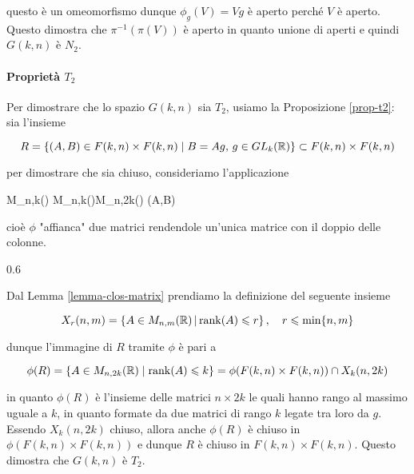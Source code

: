 questo è un omeomorfismo dunque $ \phi_{g}(V) = V g $ è aperto perché $ V $ è aperto. Questo dimostra che $ \pi^{-1}(\pi(V)) $ è aperto in quanto unione di aperti e quindi $ G(k,n) $ è $ N_{2} $.

\paragraph{Proprietà $ T_{2} $}

Per dimostrare che lo spazio $ G(k,n) $ sia $ T_{2} $, usiamo la Proposizione \ref{prop-t2}: sia l'insieme

\begin{equation}
	R = \{ (A,B) \in F(k,n) \times F(k,n) \mid B = A g, \, g \in GL_{k}(\mathbb{R}) \} \subset F(k,n) \times F(k,n)
\end{equation}

per dimostrare che sia chiuso, consideriamo l'applicazione

\map{\phi}
	{M_{n,k}(\R) \times M_{n,k}(\R)}{M_{n,2k}(\R)}
	{(A,B)}{}

cioè $ \phi $ "affianca" due matrici rendendole un'unica matrice con il doppio delle colonne.

	{0.6}{%
			}

Dal Lemma \ref{lemma-clos-matrix} prendiamo la definizione del seguente insieme

\begin{equation}
	X_{r}(n,m) = \left\{ A \in M_{n,m}(\R) \st \rank(A) \leqslant r \right\} %
	\qcomma r \leqslant \min\{n,m\}
\end{equation}

dunque l'immagine di $ R $ tramite $ \phi $ è pari a

\begin{equation}
	\phi(R) = \{ A \in M_{n,2k}(\mathbb{R}) \mid \rank(A) \leqslant k \} = \phi(F(k,n) \times F(k,n)) \cap X_{k}(n,2k)
\end{equation}

in quanto $ \phi(R) $ è l'insieme delle matrici $ n \times 2k $ le quali hanno rango al massimo uguale a $ k $, in quanto formate da due matrici di rango $ k $ legate tra loro da $ g $. Essendo $ X_{k}(n,2k) $ chiuso, allora anche $ \phi(R) $ è chiuso in $ \phi(F(k,n) \times F(k,n)) $ e dunque $ R $ è chiuso in $ F(k,n) \times F(k,n) $. Questo dimostra che $ G(k,n) $ è $ T_{2} $.

